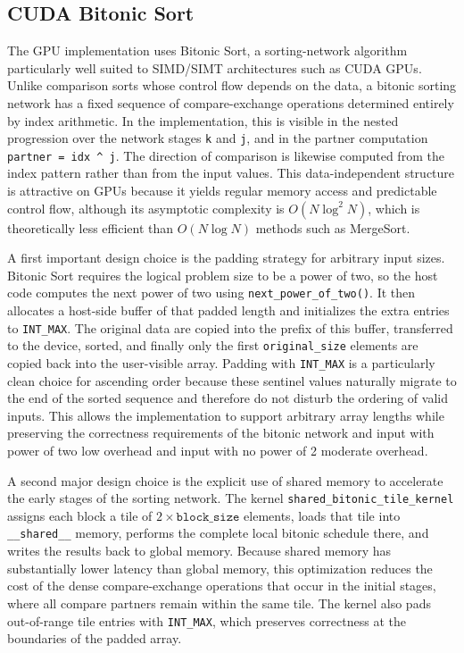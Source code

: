 \documentclass[12pt, a4paper]{article}
\begin{document}
\subsection{CUDA Bitonic Sort}
The GPU implementation uses Bitonic Sort, a sorting-network algorithm particularly well suited to SIMD/SIMT architectures such as CUDA GPUs. Unlike comparison sorts whose control flow depends on the data, a bitonic sorting network has a fixed sequence of compare-exchange operations determined entirely by index arithmetic. In the implementation, this is visible in the nested progression over the network stages \texttt{k} and \texttt{j}, and in the partner computation \texttt{partner = idx \^{} j}. The direction of comparison is likewise computed from the index pattern rather than from the input values. This data-independent structure is attractive on GPUs because it yields regular memory access and predictable control flow, although its asymptotic complexity is $O(N \log^2 N)$, which is theoretically less efficient than $O(N \log N)$ methods such as MergeSort.

A first important design choice is the padding strategy for arbitrary input sizes. Bitonic Sort requires the logical problem size to be a power of two, so the host code computes the next power of two using \texttt{next\_power\_of\_two()}. It then allocates a host-side buffer of that padded length and initializes the extra entries to \texttt{INT\_MAX}. The original data are copied into the prefix of this buffer, transferred to the device, sorted, and finally only the first \texttt{original\_size} elements are copied back into the user-visible array. Padding with \texttt{INT\_MAX} is a particularly clean choice for ascending order because these sentinel values naturally migrate to the end of the sorted sequence and therefore do not disturb the ordering of valid inputs. This allows the implementation to support arbitrary array lengths while preserving the correctness requirements of the bitonic network and input with power of two low overhead and input with no power of 2 moderate overhead.

A second major design choice is the explicit use of shared memory to accelerate the early stages of the sorting network. The kernel \texttt{shared\_bitonic\_tile\_kernel} assigns each block a tile of $2 \times \texttt{block\_size}$ elements, loads that tile into \texttt{\_\_shared\_\_} memory, performs the complete local bitonic schedule there, and writes the results back to global memory. Because shared memory has substantially lower latency than global memory, this optimization reduces the cost of the dense compare-exchange operations that occur in the initial stages, where all compare partners remain within the same tile. The kernel also pads out-of-range tile entries with \texttt{INT\_MAX}, which preserves correctness at the boundaries of the padded array.
\end{document}
